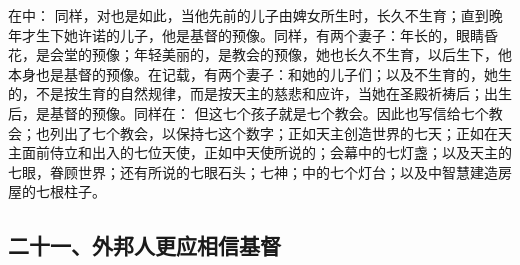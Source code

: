 在中：  同样，对也是如此，当他先前的儿子由婢女所生时，长久不生育；直到晚年才生下她许诺的儿子，他是基督的预像。同样，有两个妻子：年长的，眼睛昏花，是会堂的预像；年轻美丽的，是教会的预像，她也长久不生育，以后生下，他本身也是基督的预像。在记载，有两个妻子：和她的儿子们；以及不生育的，她生的，不是按生育的自然规律，而是按天主的慈悲和应许，当她在圣殿祈祷后；出生后，是基督的预像。同样在： 但这七个孩子就是七个教会。因此也写信给七个教会；也列出了七个教会，以保持七这个数字；正如天主创造世界的七天；正如在天主面前侍立和出入的七位天使，正如中天使所说的；会幕中的七灯盏；以及天主的七眼，眷顾世界；还有所说的七眼石头；七神；中的七个灯台；以及中智慧建造房屋的七根柱子。\par


\subsection{二十一、外邦人更应相信基督}

